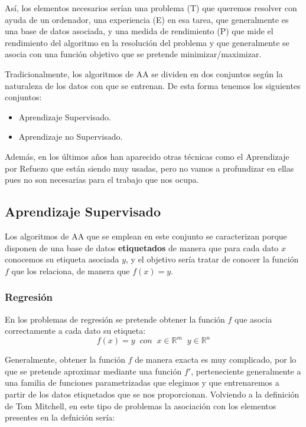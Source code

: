     \noindent Así, los elementos necesarios serían una problema (T) que queremos resolver con ayuda de un ordenador, una experiencia (E) en esa tarea, que generalmente es una base de datos asociada, y una medida de rendimiento (P) que mide el rendimiento del algoritmo en la resolución del problema y que generalmente se asocia con una función objetivo que se pretende minimizar/maximizar.

    \medskip

    \noindent Tradicionalmente, los algoritmos de AA se dividen en dos conjuntos según la naturaleza de los datos con que se entrenan. De esta forma tenemos los siguientes conjuntos:

    \begin{itemize}
        \item Aprendizaje Supervisado.
        \item Aprendizaje no Supervisado.
    \end{itemize}

    \medskip 
    
    \noindent Además, en los últimos años han aparecido otras técnicas como el Aprendizaje por Refuezo que están siendo muy usadas, pero no vamos a profundizar en ellas pues no son necesarias para el trabajo que nos ocupa.

    \subsection{Aprendizaje Supervisado}
        \noindent Los algoritmos de AA que se emplean en este conjunto se caracterizan porque disponen de una base de datos \textbf{etiquetados} de manera que para cada dato $x$ conocemos su etiqueta asociada $y$, y el objetivo sería tratar de conocer la función $f$ que los relaciona, de manera que $f(x)=y$.

        \subsubsection{Regresión} \label{section::Regresion}
            \noindent En los problemas de regresión se pretende obtener la función $f$ que asocia correctamente a cada dato su etiqueta: 
            \begin{equation}
                f(x)=y \; \; con \; \; x\in \mathbb{R}^m \; \; y \in \mathbb{R}^n
            \end{equation}
            
            \noindent Generalmente, obtener la función $f$ de manera exacta es muy complicado, por lo que se pretende aproximar mediante una función $f'$, perteneciente generalmente a una familia de funciones parametrizadas que elegimos y que entrenaremos a partir de los datos etiquetados que se nos proporcionan. Volviendo a la definición de Tom Mitchell, en este tipo de problemas la asociación con los elementos presentes en la defnición sería:
            
